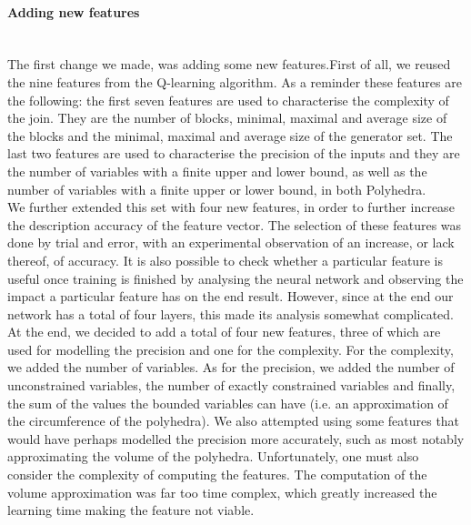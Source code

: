 \paragraph{Adding new features}\mbox{}\\
The first change we made, was adding some new features.First of all, we reused the nine features from the Q-learning algorithm. As a reminder these features are the following: the first seven features are used to characterise the complexity of the join. They are the number of blocks, minimal, maximal and average size of the blocks and the minimal, maximal and average size of the generator set. The last two features are used to characterise the precision of the inputs and they are the number of variables with a finite upper and lower bound, as well as the number of variables with a finite upper or lower bound, in both Polyhedra.\\
We further extended this set with four new features, in order to further increase the description accuracy of the feature vector. The selection of these features was done by trial and error, with an experimental observation of an increase, or lack thereof, of accuracy. It is also possible to check whether a particular feature is useful once training is finished by analysing the neural network and observing the impact a particular feature has on the end result. However, since at the end our network has a total of four layers, this made its analysis somewhat complicated.\\
At the end, we decided to add a total of four new features, three of which are used for modelling the precision and one for the complexity. For the complexity, we added the number of variables. As for the precision, we added the number of unconstrained variables, the number of exactly constrained variables and finally, the sum of the values the bounded variables can have (i.e. an approximation of the circumference of the polyhedra). We also attempted using some features that would have perhaps modelled the precision more accurately, such as most notably approximating the volume of the polyhedra. Unfortunately, one must also consider the complexity of computing the features. The computation of the volume approximation was far too time complex, which greatly increased the learning time making the feature not viable.\\
